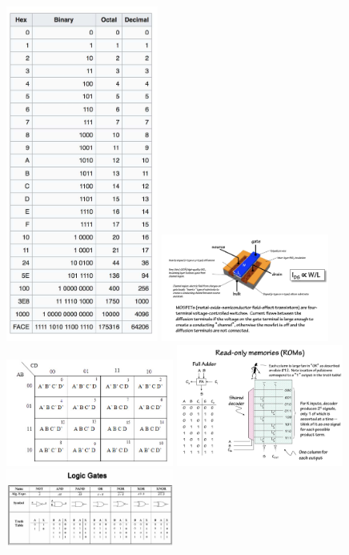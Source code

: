 \documentclass[8pt,landscape]{extarticle}
\begin{document}
\begin{multicols*}{5}
\setlength{\premulticols}{1pt}
\setlength{\postmulticols}{1pt}
\setlength{\multicolsep}{1pt}
\setlength{\columnsep}{2pt}

\includegraphics[width = 5cm]{Conversion_table}
\includegraphics[width = 5.5cm]{Mosfet}
\includegraphics[width = 5.5cm]{K-map}
\includegraphics[width = 5.5cm]{ROM}
\includegraphics[width = 5.5cm]{Logic_gates}

\end{multicols*}
\end{document}
